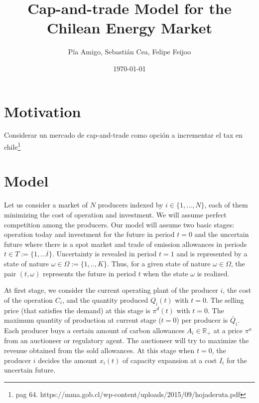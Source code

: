 \documentclass[11pt, letterpaper]{article}
\title{Cap-and-trade Model for the Chilean Energy Market}
\author{P\'ia Amigo, Sebasti\'an Cea, Felipe Feijoo}
\date{\today}
\begin{document}
\linenumbers
\maketitle

\section{Motivation}

Considerar un mercado de cap-and-trade como opción a incrementar el tax en chile\footnote{pag 64. https://mma.gob.cl/wp-content/uploads/2015/09/hojaderuta.pdf}



\section{Model}\label{model}

Let us consider a market of $N$ producers indexed by $i\in\{1,...,N\}$, each of them minimizing the cost of operation and investment. We will assume perfect competition among the producers. Our model will assume two basic stages: operation today and investment for the future in period $t=0$ and the uncertain future where there is a spot market and trade of emission allowances in periods $t\in T:=\{1,...\bar{t}\}$. Uncertainty is revealed in period $t=1$ and is represented by a state of nature $\omega\in\Omega:=\{1,..,K\}$. Thus, for a given state of nature $\omega\in\Omega$, the pair $(t,\omega)$ represents the future in period $t$ when the state $\omega$ is realized.

\smallskip

At first stage, we consider the current operating plant of the producer $i$, the cost of the operation $C_i$, and the quantity produced $Q_i(t)$ with $t=0$. The selling price (that satisfies the demand) at this stage is $\pi^d(t)$ with $t=0$. The maximum quantity of production at current stage ($t=0$) per producer is $\bar{Q}_i$. Each producer buys a certain amount of carbon allowances $A_i\in\mathbb{R}_+$ at a price $\pi^{a}$ from an auctioneer or regulatory agent.  The auctioneer will try to maximize the revenue obtained from the sold allowances. At this stage when $t=0$, the producer $i$ decides the amount $x_i(t)$ of capacity expansion at a cost $I_i$ for the uncertain future.
\smallskip
\end{document}
